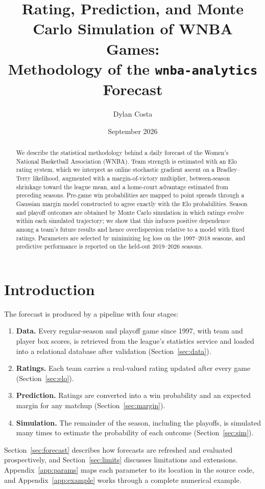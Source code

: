 \documentclass[11pt]{article}
\title{Rating, Prediction, and Monte Carlo Simulation of WNBA Games:\\ Methodology of the \texttt{wnba-analytics} Forecast}
\author{Dylan Costa}
\date{September 2026}
\newcommand{\trainyears}{1997--2018}
\newcommand{\testyears}{2019--2026}
\theoremstyle{plain}
\theoremstyle{definition}
\theoremstyle{remark}
\begin{document}
\maketitle

\begin{abstract}
We describe the statistical methodology behind a daily forecast of the Women's National Basketball Association (WNBA). Team strength is estimated with an Elo rating system, which we interpret as online stochastic gradient ascent on a Bradley--Terry likelihood, augmented with a margin-of-victory multiplier, between-season shrinkage toward the league mean, and a home-court advantage estimated from preceding seasons. Pre-game win probabilities are mapped to point spreads through a Gaussian margin model constructed to agree exactly with the Elo probabilities. Season and playoff outcomes are obtained by Monte Carlo simulation in which ratings evolve within each simulated trajectory; we show that this induces positive dependence among a team's future results and hence overdispersion relative to a model with fixed ratings. Parameters are selected by minimizing log loss on the \trainyears{} seasons, and predictive performance is reported on the held-out \testyears{} seasons.
\end{abstract}

\tableofcontents

\section{Introduction}

The forecast is produced by a pipeline with four stages:
\begin{enumerate}
  \item \textbf{Data.} Every regular-season and playoff game since 1997, with team and player box scores, is retrieved from the league's statistics service and loaded into a relational database after validation (Section~\ref{sec:data}).
  \item \textbf{Ratings.} Each team carries a real-valued rating updated after every game (Section~\ref{sec:elo}).
  \item \textbf{Prediction.} Ratings are converted into a win probability and an expected margin for any matchup (Section~\ref{sec:margin}).
  \item \textbf{Simulation.} The remainder of the season, including the playoffs, is simulated many times to estimate the probability of each outcome (Section~\ref{sec:sim}).
\end{enumerate}
Section~\ref{sec:forecast} describes how forecasts are refreshed and evaluated prospectively, and Section~\ref{sec:limits} discusses limitations and extensions. Appendix~\ref{app:params} maps each parameter to its location in the source code, and Appendix~\ref{app:example} works through a complete numerical example.
\end{document}
